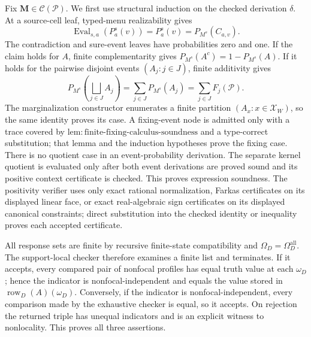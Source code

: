 Fix \(\mathbf M\in\mathcal C(\mathcal P)\).  We first use structural induction on the checked derivation \(\delta\).  At a source-cell leaf, typed-menu realizability gives
\[
\operatorname{Eval}_{s,a}(P_a^s(v))=P_a^s(v)=P_{M^s}(C_{a,v}).
\]
The contradiction and sure-event leaves have probabilities zero and one.  If the claim holds for \(A\), finite complementarity gives \(P_{M^s}(A^c)=1-P_{M^s}(A)\).  If it holds for the pairwise disjoint events \((A_j:j\in J)\), finite additivity gives
\[
P_{M^s}\!\left(\bigsqcup_{j\in J}A_j\right)
=\sum_{j\in J}P_{M^s}(A_j)
=\sum_{j\in J}F_j(\mathcal P).
\]
The marginalization constructor enumerates a finite partition \((A_x:x\in\mathcal X_W)\), so the same identity proves its case.  A fixing-event node is admitted only with a trace covered by \(\mathrm{lem:finite\text{-}fixing\text{-}calculus\text{-}soundness}\) and a type-correct substitution; that lemma and the induction hypotheses prove the fixing case.  There is no quotient case in an event-probability derivation.  The separate kernel quotient is evaluated only after both event derivations are proved sound and its positive context certificate is checked.  This proves expression soundness.  The positivity verifier uses only exact rational normalization, Farkas certificates on its displayed linear face, or exact real-algebraic sign certificates on its displayed canonical constraints; direct substitution into the checked identity or inequality proves each accepted certificate.

All response sets are finite by recursive finite-state compatibility and \(\Omega_D=\Omega_D^{\mathrm{all}}\).  The support-local checker therefore examines a finite list and terminates.  If it accepts, every compared pair of nonfocal profiles has equal truth value at each \(\omega_D\); hence the indicator is nonfocal-independent and equals the value stored in \(\operatorname{row}_D(A)(\omega_D)\).  Conversely, if the indicator is nonfocal-independent, every comparison made by the exhaustive checker is equal, so it accepts.  On rejection the returned triple has unequal indicators and is an explicit witness to nonlocality.  This proves all three assertions.